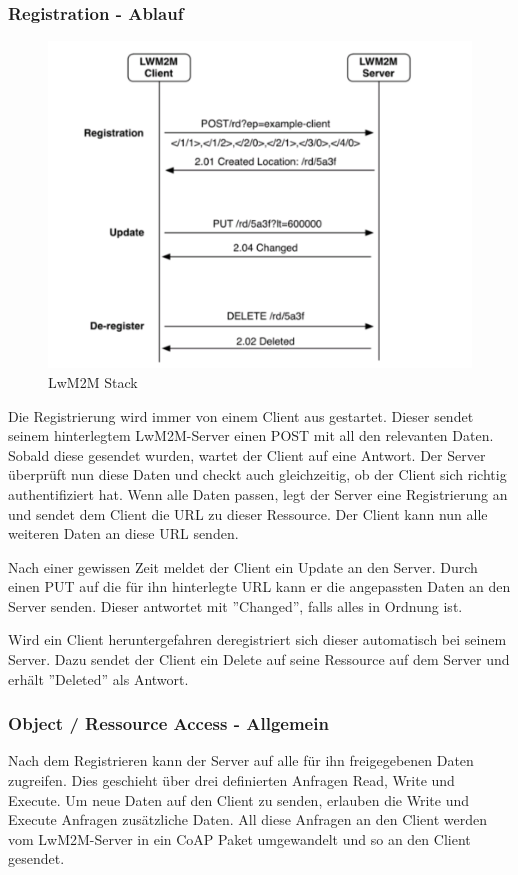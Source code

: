 \subsubsection{Registration - Ablauf}
\begin{figure}[H]
\includegraphics[scale=0.4]{../02_Analyse/images/lwm2m/registration_diagram.png}
\caption{LwM2M Stack\cite{LwM2MInterfaces}}
\end{figure}
Die Registrierung wird immer von einem Client aus gestartet. Dieser sendet seinem hinterlegtem LwM2M-Server einen POST mit all den relevanten Daten. Sobald diese gesendet wurden, wartet der Client auf eine Antwort. Der Server überprüft nun diese Daten und checkt auch gleichzeitig, ob der Client sich richtig authentifiziert hat. Wenn alle Daten passen, legt der Server eine Registrierung an und sendet dem Client die URL zu dieser Ressource. Der Client kann nun alle weiteren Daten an diese URL senden.

Nach einer gewissen Zeit meldet der Client ein Update an den Server. Durch einen PUT auf die für ihn hinterlegte URL kann er die angepassten Daten an den Server senden. Dieser antwortet mit ''Changed'', falls alles in Ordnung ist.

Wird ein Client heruntergefahren deregistriert sich dieser automatisch bei seinem Server. Dazu sendet der Client ein Delete auf seine Ressource auf dem Server und erhält ''Deleted'' als Antwort. 

\newpage

\subsubsection{Object / Ressource Access - Allgemein}
Nach dem Registrieren kann der Server auf alle für ihn freigegebenen Daten zugreifen. Dies geschieht über drei definierten Anfragen Read, Write und Execute. Um neue Daten auf den Client zu senden, erlauben die Write und Execute Anfragen zusätzliche Daten. All diese Anfragen an den Client werden vom LwM2M-Server in ein CoAP Paket umgewandelt und so an den Client gesendet.
